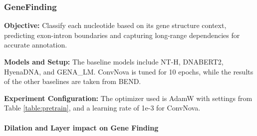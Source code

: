 

\subsubsection{GeneFinding}\label{app:genefinding}
\textbf{Objective:} Classify each nucleotide based on its gene structure context, predicting exon-intron boundaries and capturing long-range dependencies for accurate annotation.

\textbf{Models and Setup:} The baseline models include NT-H, DNABERT2, HyenaDNA, and GENA\_LM. ConvNova is tuned for 10 epochs, while the results of the other baselines are taken from BEND. 

\textbf{Experiment Configuration:} The optimizer used is AdamW with settings from Table \ref{table:pretrain}, and a learning rate of 1e-3 for ConvNova.
\paragraph{Dilation and Layer impact on Gene Finding}


